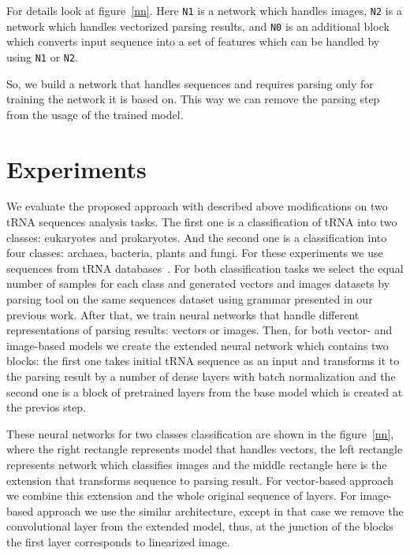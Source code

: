 \documentclass[12pt,a4paper]{cibb}
\begin{document}
For details look at figure~\ref{nn}. Here \texttt{N1} is a network which handles images, \texttt{N2} is a network which handles vectorized parsing results, and \texttt{N0} is an additional block which converts input sequence into a set of features which can be handled by using \texttt{N1} or \texttt{N2}.

So, we build a network that handles sequences and requires parsing only for training the network it is based on.
This way we can remove the parsing step from the usage of the trained model.


\section{\bf Experiments}

We evaluate the proposed approach with described above modifications on two tRNA sequences analysis tasks.
The first one is a classification of tRNA into two classes: eukaryotes and prokaryotes.
And the second one is a classification into four classes: archaea, bacteria, plants and fungi.
For these experiments we use sequences from tRNA databases~\cite{trnadb1,trnadb2}.
For both classification tasks we select the equal number of samples for each class and generated vectors and images datasets by parsing tool on the same sequences dataset using grammar presented in our previous work.
After that, we train neural networks that handle different representations of parsing results: vectors or images.
Then, for both vector- and image-based models we create the extended neural network which contains two blocks: the first one takes initial tRNA sequence as an input and transforms it to the parsing result by a number of dense layers with batch normalization and the second one is a block of pretrained layers from the base model which is created at the previos step.

These neural networks for two classes classification are shown in the figure~\ref{nn}, where the right rectangle represents model that handles vectors, the left rectangle represents network which classifies images and the middle rectangle here is the extension that transforms sequence to parsing result. For vector-based approach we combine this extension and the whole original sequence of layers.
For image-based approach we use the similar architecture, except in that case we remove the convolutional layer from the extended model, thus, at the junction of the blocks the first layer corresponds to linearized image.
\end{document}
